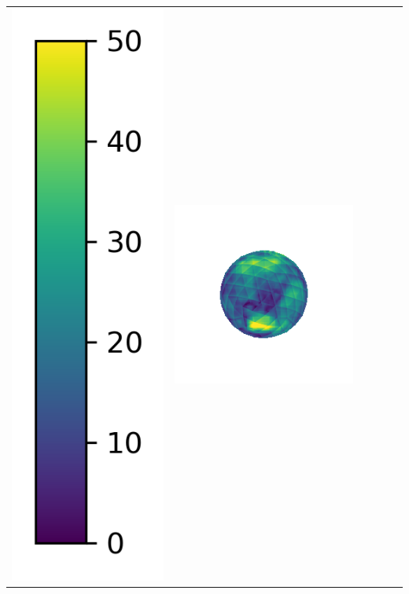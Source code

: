 \begin{tabularx}{\linewidth}{@{}Y@{}Y@{}Y@{}Y@{}Y@{}Y@{}}
\includegraphics[width=0.2\linewidth]{semisynthetic/colorbar_error_vertical.png} &
\includegraphics[width=\linewidth]{semisynthetic/20160617_1_ours_err.png} &

\end{tabularx}
